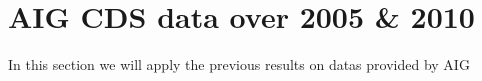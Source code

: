 
\section{AIG CDS data over 2005 \& 2010}
\label{sec:aig-cds-data}

In this section we will apply the previous results on datas provided by AIG
